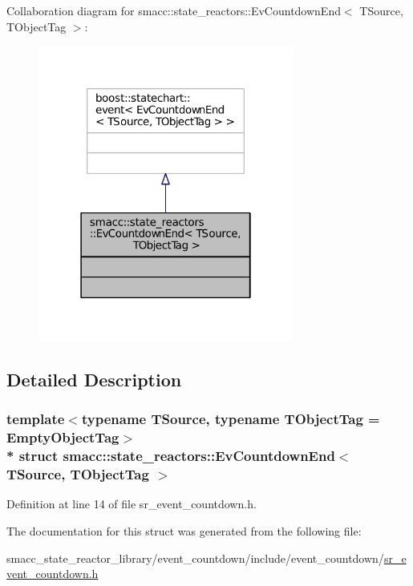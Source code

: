 Collaboration diagram for smacc\+:\+:state\+\_\+reactors\+:\+:Ev\+Countdown\+End$<$ T\+Source, T\+Object\+Tag $>$\+:
\nopagebreak
\begin{figure}[H]
\begin{center}
\leavevmode
\includegraphics[width=238pt]{structsmacc_1_1state__reactors_1_1EvCountdownEnd__coll__graph}
\end{center}
\end{figure}


\subsection{Detailed Description}
\subsubsection*{template$<$typename T\+Source, typename T\+Object\+Tag = Empty\+Object\+Tag$>$\\*
struct smacc\+::state\+\_\+reactors\+::\+Ev\+Countdown\+End$<$ T\+Source, T\+Object\+Tag $>$}



Definition at line 14 of file sr\+\_\+event\+\_\+countdown.\+h.



The documentation for this struct was generated from the following file\+:\begin{DoxyCompactItemize}
\item 
smacc\+\_\+state\+\_\+reactor\+\_\+library/event\+\_\+countdown/include/event\+\_\+countdown/\hyperlink{sr__event__countdown_8h}{sr\+\_\+event\+\_\+countdown.\+h}\end{DoxyCompactItemize}
